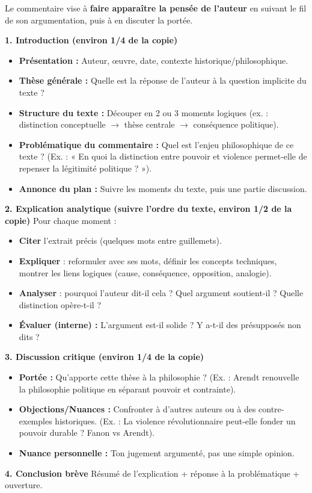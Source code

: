 \documentclass[11pt]{article}
\begin{document}
\begin{methode}
Le commentaire vise à \textbf{faire apparaître la pensée de l'auteur} en suivant le fil de son argumentation, puis à en discuter la portée.

\textbf{1. Introduction (environ 1/4 de la copie)}
\begin{itemize}
\item \textbf{Présentation :} Auteur, œuvre, date, contexte historique/philosophique.
\item \textbf{Thèse générale :} Quelle est la réponse de l'auteur à la question implicite du texte ?
\item \textbf{Structure du texte :} Découper en 2 ou 3 moments logiques (ex. : distinction conceptuelle $\rightarrow$ thèse centrale $\rightarrow$ conséquence politique).
\item \textbf{Problématique du commentaire :} Quel est l'enjeu philosophique de ce texte ? (Ex. : « En quoi la distinction entre pouvoir et violence permet-elle de repenser la légitimité politique ? »).
\item \textbf{Annonce du plan :} Suivre les moments du texte, puis une partie discussion.
\end{itemize}

\textbf{2. Explication analytique (suivre l'ordre du texte, environ 1/2 de la copie)}
Pour chaque moment :
\begin{itemize}
\item \textbf{Citer} l'extrait précis (quelques mots entre guillemets).
\item \textbf{Expliquer} : reformuler avec ses mots, définir les concepts techniques, montrer les liens logiques (cause, conséquence, opposition, analogie).
\item \textbf{Analyser} : pourquoi l'auteur dit-il cela ? Quel argument soutient-il ? Quelle distinction opère-t-il ?
\item \textbf{Évaluer (interne) :} L'argument est-il solide ? Y a-t-il des présupposés non dits ?
\end{itemize}

\textbf{3. Discussion critique (environ 1/4 de la copie)}
\begin{itemize}
\item \textbf{Portée :} Qu'apporte cette thèse à la philosophie ? (Ex. : Arendt renouvelle la philosophie politique en séparant pouvoir et contrainte).
\item \textbf{Objections/Nuances :} Confronter à d'autres auteurs ou à des contre-exemples historiques. (Ex. : La violence révolutionnaire peut-elle fonder un pouvoir durable ? Fanon vs Arendt).
\item \textbf{Nuance personnelle :} Ton jugement argumenté, pas une simple opinion.
\end{itemize}

\textbf{4. Conclusion brève}
Résumé de l'explication + réponse à la problématique + ouverture.
\end{methode}
\end{document}
